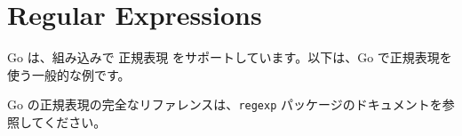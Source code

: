 \section{Regular Expressions}

Go は、組み込みで 正規表現 をサポートしています。以下は、Go で正規表現を使う一般的な例です。




Go の正規表現の完全なリファレンスは、\texttt{regexp} パッケージのドキュメントを参照してください。